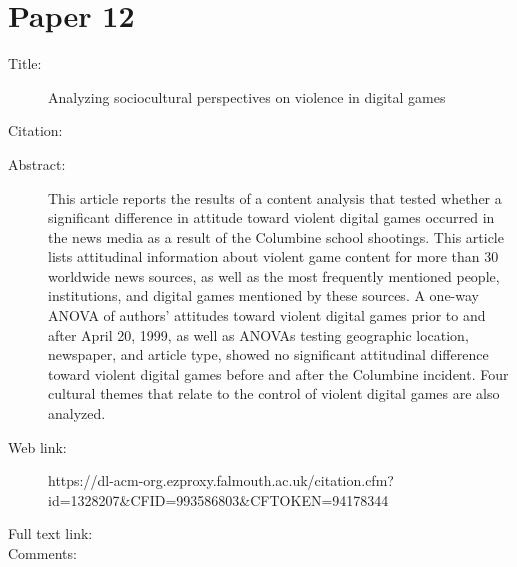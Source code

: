 \documentclass{scrartcl}
\begin{document}
\section*{Paper 12}
\begin{description}
\item[Title:] Analyzing sociocultural perspectives on violence in digital games
\item[Citation:] \cite{}
\item[Abstract:] This article reports the results of a content analysis that tested whether a significant difference in attitude toward violent digital games occurred in the news media as a result of the Columbine school shootings. This article lists attitudinal information about violent game content for more than 30 worldwide news sources, as well as the most frequently mentioned people, institutions, and digital games mentioned by these sources. A one-way ANOVA of authors' attitudes toward violent digital games prior to and after April 20, 1999, as well as ANOVAs testing geographic location, newspaper, and article type, showed no significant attitudinal difference toward violent digital games before and after the Columbine incident. Four cultural themes that relate to the control of violent digital games are also analyzed.
\item[Web link:] https://dl-acm-org.ezproxy.falmouth.ac.uk/citation.cfm?id=1328207&CFID=993586803&CFTOKEN=94178344
\item[Full text link:] 
\item[Comments:]   
\end{description}




\end{document}

